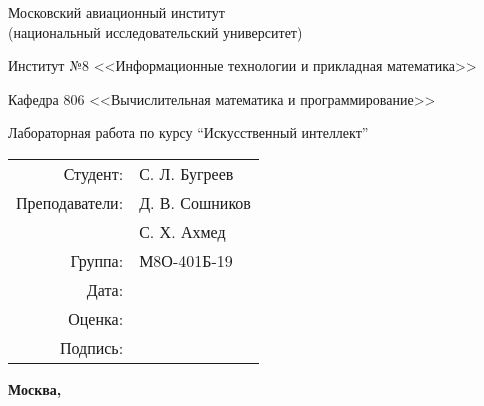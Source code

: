 \begin{titlepage}
\begin{center}
\bfseries

{\Large Московский авиационный институт \\ (национальный исследовательский университет)

}

\vspace{48pt}

{\large Институт №8 <<Информационные технологии и прикладная математика>>
}

\vspace{36pt}

{\large Кафедра 806 <<Вычислительная математика и программирование>>

}

\vspace{48pt}

Лабораторная работа  по курсу \enquote{Искусственный интеллект}

\end{center}

\vspace{72pt}

\begin{flushright}
\begin{tabular}{rl}
Студент: & С. Л. Бугреев \\
Преподаватели: & Д. В. Сошников\\
& С. Х. Ахмед\\
Группа: & М8О-401Б-19 \\
Дата: & \\
Оценка: & \\
Подпись: & \\
\end{tabular}
\end{flushright}

\vfill

\begin{center}
\bfseries
Москва, \the\year
\end{center}
\end{titlepage}

\pagebreak
